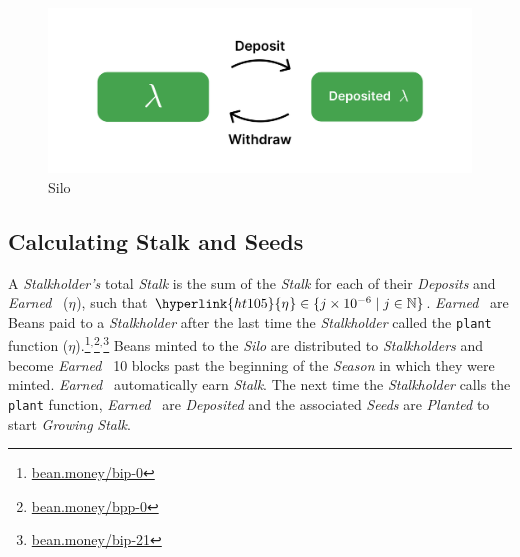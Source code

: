 \documentclass[tikz]{article}
\newcommand{\code}[1]{\texttt{#1}}
\newcommand{\term}[1]{\textsl{#1}}
\newcommand{\Bean}{} %
\newcommand{\bean}{} %
\begin{document}
\begin{figure}[h!]
    \centering
    \includegraphics[scale=.16]{Figure1}
    \vspace*{-5mm}
    \caption{Silo}
    \label{fig 1}
\end{figure}


\vspace*{-1mm}
\subsection{Calculating Stalk and Seeds}
\vspace*{-1mm}

A \term{Stalkholder's} total \term{Stalk} is the sum of the \term{Stalk} for each of their \term{Deposits} and \term{Earned} \Bean\ (\hyperlink{ht105}{$\eta^{\bean}$}), such that $\hyperlink{ht105}{\eta^{\bean}} \in \{j \times 10^{-6} \mid j \in \mathbb{N} \}$. 
\term{Earned} \Bean\ are Beans paid to a \term{Stalkholder} after the last time the \term{Stalkholder} called the \code{plant} function (\hyperlink{ht104}{$\eta$}).\footnote{\href{https://bean.money/bip-0}{bean.money/bip-0}}$^{,}$\footnote{\href{https://bean.money/bpp-0}{bean.money/bpp-0}}$^{,}$\footnote{\href{https://bean.money/bip-21}{bean.money/bip-21}} Beans minted to the \term{Silo} are distributed to \term{Stalkholders} and become \term{Earned} \Bean\ 10 blocks past the beginning of the \term{Season} in which they were minted. \term{Earned} \Bean\ automatically earn \term{Stalk}. The next time the \term{Stalkholder} calls the \code{plant} function, \term{Earned} \Bean\ are \term{Deposited} and the associated \term{Seeds} are \term{Planted} to start \term{Growing} \term{Stalk}.
\end{document}
